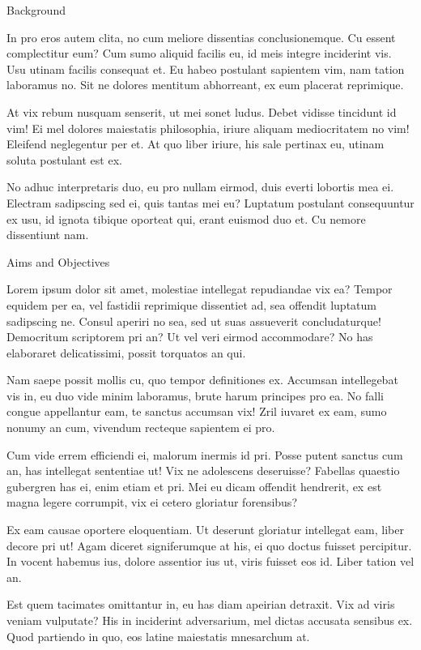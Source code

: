 \begin{introduction}
\begin{section}{Background}
{    In pro eros autem clita, no cum meliore dissentias conclusionemque. Cu essent complectitur eum? Cum sumo aliquid facilis eu, id meis integre inciderint vis. Usu utinam facilis consequat et. Eu habeo postulant sapientem vim, nam tation laboramus no. Sit ne dolores mentitum abhorreant, ex eum placerat reprimique.
    
    At vix rebum nusquam senserit, ut mei sonet ludus. Debet vidisse tincidunt id vim! Ei mel dolores maiestatis philosophia, iriure aliquam mediocritatem no vim! Eleifend neglegentur per et. At quo liber iriure, his sale pertinax eu, utinam soluta postulant est ex.
    
    No adhuc interpretaris duo, eu pro nullam eirmod, duis everti lobortis mea ei. Electram sadipscing sed ei, quis tantas mei eu? Luptatum postulant consequuntur ex usu, id ignota tibique oporteat qui, erant euismod duo et. Cu nemore dissentiunt nam.

}
\end{section}
\begin{section}{Aims and Objectives}
{

    Lorem ipsum dolor sit amet, molestiae intellegat repudiandae vix ea? Tempor equidem per ea, vel fastidii reprimique dissentiet ad, sea offendit luptatum sadipscing ne. Consul aperiri no sea, sed ut suas assueverit concludaturque! Democritum scriptorem pri an? Ut vel veri eirmod accommodare? No has elaboraret delicatissimi, possit torquatos an qui.

    Nam saepe possit mollis cu, quo tempor definitiones ex. Accumsan intellegebat vis in, eu duo vide minim laboramus, brute harum principes pro ea. No falli congue appellantur eam, te sanctus accumsan vix! Zril iuvaret ex eam, sumo nonumy an cum, vivendum recteque sapientem ei pro.
    
    Cum vide errem efficiendi ei, malorum inermis id pri. Posse putent sanctus cum an, has intellegat sententiae ut! Vix ne adolescens deseruisse? Fabellas quaestio gubergren has ei, enim etiam et pri. Mei eu dicam offendit hendrerit, ex est magna legere corrumpit, vix ei cetero gloriatur forensibus?
    
    Ex eam causae oportere eloquentiam. Ut deserunt gloriatur intellegat eam, liber decore pri ut! Agam diceret signiferumque at his, ei quo doctus fuisset percipitur. In vocent habemus ius, dolore assentior ius ut, viris fuisset eos id. Liber tation vel an.
    
    Est quem tacimates omittantur in, eu has diam apeirian detraxit. Vix ad viris veniam vulputate? His in inciderint adversarium, mel dictas accusata sensibus ex. Quod partiendo in quo, eos latine maiestatis mnesarchum at.
    
}
\end{section}
\end{introduction}
